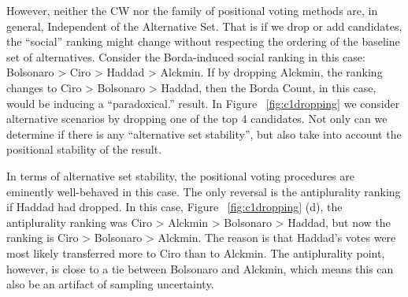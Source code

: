\documentclass[hidelinks,11pt]{article}
\begin{document}


However, neither the CW nor the family of positional voting methods are, in
general, Independent of the Alternative Set\parencite{kaminski2015empirical}.
That is if we drop or add candidates, the ``social'' ranking might change
without respecting the ordering of the baseline set of alternatives. Consider
the Borda-induced social ranking in this case: Bolsonaro > Ciro > Haddad >
Alckmin. If by dropping Alckmin, the ranking changes to Ciro > Bolsonaro >
Haddad, then the Borda Count, in this case, would be inducing a ``paradoxical.''
result. In Figure ~\ref{fig:c1dropping} we consider alternative scenarios by
dropping one of the top 4 candidates. Not only can we determine if there is any ``alternative set stability'', but also take into account the positional stability of the result.

In terms of alternative set stability, the positional voting
procedures are eminently well-behaved in this case. The only reversal is the
antiplurality ranking if Haddad had dropped. In this case, Figure
~\ref{fig:c1dropping} (d), the antiplurality ranking was  Ciro > Alckmin >
Bolsonaro > Haddad, but now the ranking is Ciro > Bolsonaro > Alckmin. The
reason is that Haddad's votes were most likely transferred more to Ciro
than to Alckmin. The antiplurality point, however, is close to a tie
between Bolsonaro and Alckmin, which means this can also be an artifact
of sampling uncertainty.
\end{document}
